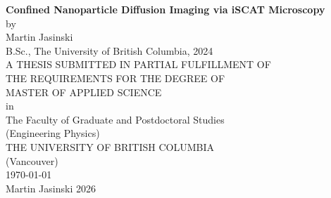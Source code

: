 \documentclass[12pt, oneside]{book}
\begin{document}
    \begin{titlepage}
        \begin{center}

        \vspace*{2cm}

        {\huge \bfseries Confined Nanoparticle Diffusion Imaging via iSCAT Microscopy}\\[0.5cm]
        by\\[0.5cm]
        {\normalsize Martin Jasinski}\\[0.5cm]
        B.Sc., The University of British Columbia, 2024
        \\[1cm]

        A THESIS SUBMITTED IN PARTIAL FULFILLMENT OF\\
        THE REQUIREMENTS FOR THE DEGREE OF\\[0.2cm]

        {\normalsize MASTER OF APPLIED SCIENCE}\\[0.5cm]

        in\\[0.5cm]
        The Faculty of Graduate and Postdoctoral Studies \\[0.2cm]
        {\normalsize (Engineering Physics)}\\[1cm]

        {\normalsize THE UNIVERSITY OF BRITISH COLUMBIA}\\[0.2cm]
        {\normalsize (Vancouver)}\\[0.2cm]
        {\normalsize \today}\\[0.2cm]
        {\normalsize \textcopyright \space Martin Jasinski 2026}\

        \vfill

        \end{center}
    \end{titlepage}
    
    \setcounter{page}{2}
    

    

    \renewcommand{\contentsname}{Table of Contents}
    \tableofcontents
\end{document}
